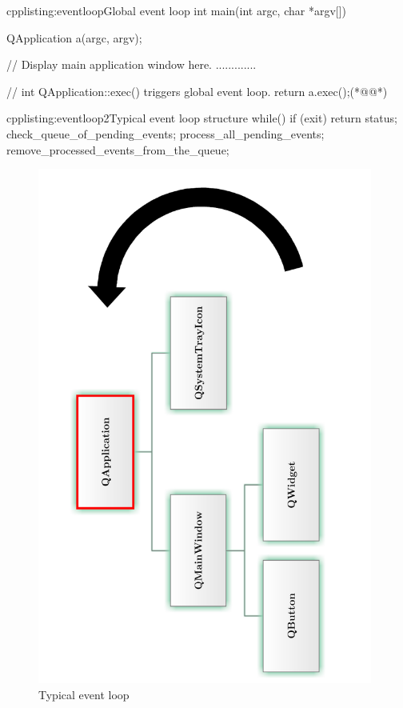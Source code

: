 \begin{fdoccode}{cpp}{listing:eventloop}{Global event loop}
int main(int argc, char *argv[]) {
    QApplication a(argc, argv);
    
    // Display main application window here.
    .............

	// int QApplication::exec() triggers global event loop.
    return a.exec();(*@\label{listing:loop1}@*)
}
\end{fdoccode}

\begin{fdoccode}{cpp}{listing:eventloop2}{Typical event loop structure}
while() {
	if (exit) {
		return status;
	}
	check_queue_of_pending_events;
	process_all_pending_events;
	remove_processed_events_from_the_queue;
}
\end{fdoccode}

\begin{figure}[ht]
\centering
\includegraphics[angle=-90,width=11cm]{graphics/laboratory/15-eventloop.pdf}
\caption{Typical event loop}\label{figure:eventloop}
\end{figure}

